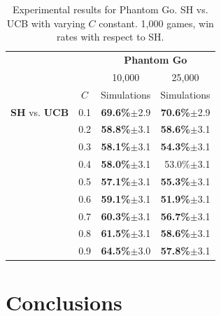 \documentclass[a4paper]{llncs}
\begin{document}
\begin{table}[ht]
\centering
\setlength{\tabcolsep}{10pt}
\begin{tabular}{@{}llrr@{}}
\toprule
& & \multicolumn{2}{c}{\textbf{Phantom Go}} \\
& & \multicolumn{1}{c}{10,000} & \multicolumn{1}{c}{25,000} \\
& \multicolumn{1}{c}{$C$} & \multicolumn{1}{c}{Simulations} & \multicolumn{1}{c}{Simulations} \\ [1mm] \cmidrule(l){1-4}
\textbf{SH} vs. \textbf{UCB}  & 0.1 & \textbf{69.6\%}$\pm$2.9 & \textbf{70.6\%}$\pm$2.9 \\ [.5mm]
 & 0.2 & \textbf{58.8\%}$\pm$3.1 & \textbf{58.6\%}$\pm$3.1 \\[.5mm]
 & 0.3 & \textbf{58.1\%}$\pm$3.1 & \textbf{54.3\%}$\pm$3.1 \\[.5mm]
 & 0.4 & \textbf{58.0\%}$\pm$3.1 & 53.0\%$\pm$3.1          \\[.5mm]
 & 0.5 & \textbf{57.1\%}$\pm$3.1 & \textbf{55.3\%}$\pm$3.1 \\[.5mm]
 & 0.6 & \textbf{59.1\%}$\pm$3.1 & \textbf{51.9\%}$\pm$3.1 \\[.5mm]
 & 0.7 & \textbf{60.3\%}$\pm$3.1 & \textbf{56.7\%}$\pm$3.1 \\[.5mm]
 & 0.8 & \textbf{61.5\%}$\pm$3.1 & \textbf{58.6\%}$\pm$3.1 \\[.5mm]
 & 0.9 & \textbf{64.5\%}$\pm$3.0 & \textbf{57.8\%}$\pm$3.1 \\[.5mm]
\bottomrule
\end{tabular}
\vspace{2mm}
{\caption{Experimental results for Phantom Go. SH vs. UCB with varying $C$ constant. 1,000 games, win rates with respect to SH.} \label{tab:ph_go}}
\end{table}

\section{Conclusions}
\label{sec:concl}



\end{document}
